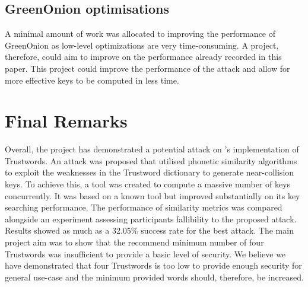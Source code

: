\subsection*{GreenOnion optimisations}
A minimal amount of work was allocated to improving the performance of GreenOnion as low-level optimizations are very time-consuming. A project, therefore, could aim to improve on the performance already recorded in this paper. This project could improve the performance of the attack and allow for more effective keys to be computed in less time. 

\section{Final Remarks}
Overall, the project has demonstrated a potential attack on \pep's implementation of Trustwords. An attack was proposed that utilised phonetic similarity algorithms to exploit the weaknesses in the Trustword dictionary to generate near-collision keys. To achieve this, a tool was created to compute a massive number of keys concurrently. It was based on a known tool but improved substantially on its key searching performance. The performance of similarity metrics was compared alongside an experiment assessing participants fallibility to the proposed attack. Results showed as much as a 32.05\% success rate for the best attack. The main project aim was to show that the recommend minimum number of four Trustwords was insufficient to provide a basic level of security. We believe we have demonstrated that four Trustwords is too low to provide enough security for general use-case and the minimum provided words should, therefore, be increased.